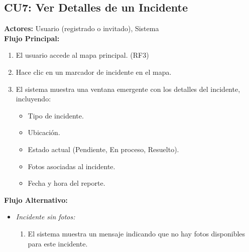 \subsection*{CU7: Ver Detalles de un Incidente}
\textbf{Actores:} Usuario (registrado o invitado), Sistema\\
\textbf{Flujo Principal:}
\begin{enumerate}
    \item El usuario accede al mapa principal. (RF3)
    \item Hace clic en un marcador de incidente en el mapa.
    \item El sistema muestra una ventana emergente con los detalles del incidente, incluyendo:
    \begin{itemize}
        \item Tipo de incidente.
        \item Ubicación.
        \item Estado actual (Pendiente, En proceso, Resuelto).
        \item Fotos asociadas al incidente.
        \item Fecha y hora del reporte.
    \end{itemize}
\end{enumerate}
\textbf{Flujo Alternativo:}
\begin{itemize}
    \item \textit{Incidente sin fotos:}
    \begin{enumerate}
        \item El sistema muestra un mensaje indicando que no hay fotos disponibles para este incidente.
    \end{enumerate}
\end{itemize}

